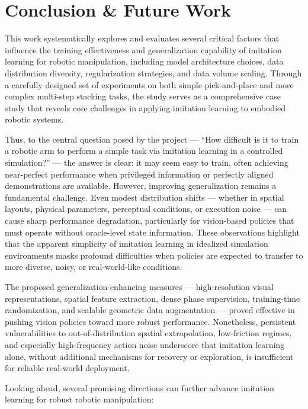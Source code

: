 \documentclass{article} %
\begin{document}
\section{Conclusion \& Future Work}
This work systematically explores and evaluates several critical factors that influence the training effectiveness and generalization capability of imitation learning for robotic manipulation, including model architecture choices, data distribution diversity, regularization strategies, and data volume scaling. Through a carefully designed set of experiments on both simple pick-and-place and more complex multi-step stacking tasks, the study serves as a comprehensive case study that reveals core challenges in applying imitation learning to embodied robotic systems.

Thus, to the central question posed by the project — “How difficult is it to train a robotic arm to perform a simple task via imitation learning in a controlled simulation?” — the answer is clear: it may seem easy to train, often achieving near-perfect performance when privileged information or perfectly aligned demonstrations are available. However, improving generalization remains a fundamental challenge. Even modest distribution shifts — whether in spatial layouts, physical parameters, perceptual conditions, or execution noise — can cause sharp performance degradation, particularly for vision-based policies that must operate without oracle-level state information. These observations highlight that the apparent simplicity of imitation learning in idealized simulation environments masks profound difficulties when policies are expected to transfer to more diverse, noisy, or real-world-like conditions.

The proposed generalization-enhancing measures — high-resolution visual representations, spatial feature extraction, dense phase supervision, training-time randomization, and scalable geometric data augmentation — proved effective in pushing vision policies toward more robust performance. Nonetheless, persistent vulnerabilities to out-of-distribution spatial extrapolation, low-friction regimes, and especially high-frequency action noise underscore that imitation learning alone, without additional mechanisms for recovery or exploration, is insufficient for reliable real-world deployment.

Looking ahead, several promising directions can further advance imitation learning for robust robotic manipulation:
\end{document}
